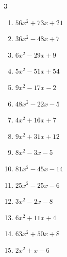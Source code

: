 \begin{multicols}{3}
\begin{enumerate}
  \item $56x^{2}+73x+21$

        \phantom{$=(8x+7)(7x+3)$}

  \item $36x^{2}-48x+7$

        \phantom{$=(6x-7)(6x-1)$}

  \item $6x^{2}-29x+9$

        \phantom{$=(3x-1)(2x-9)$}

  \item $5x^{2}-51x+54$

        \phantom{$=(x-9)(5x-6)$}

  \item $9x^{2}-17x-2$

        \phantom{$=(9x+1)(x-2)$}

  \item $48x^{2}-22x-5$

        \phantom{$=(6x+1)(8x-5)$}

\columnbreak %

  \item $4x^{2}+16x+7$

        \phantom{$=(2x+7)(2x+1)$}

  \item $9x^{2}+31x+12$

        \phantom{$=(9x+4)(x+3)$}

  \item $8x^{2}-3x-5$

        \phantom{$=(8x+5)(x-1)$}

  \item $81x^{2}-45x-14$

        \phantom{$=(9x-7)(9x+2)$}

  \item $25x^{2}-25x-6$

        \phantom{$=(5x-6)(5x+1)$}

  \item $3x^{2}-2x-8$

        \phantom{$=(x-2)(3x+4)$}

  \item $6x^{2}+11x+4$

        \phantom{$=(3x+4)(2x+1)$}

  \item $63x^{2}+50x+8$

        \phantom{$=(7x+4)(9x+2)$}

  \item $2x^{2}+x-6$


\end{enumerate}
\end{multicols}
